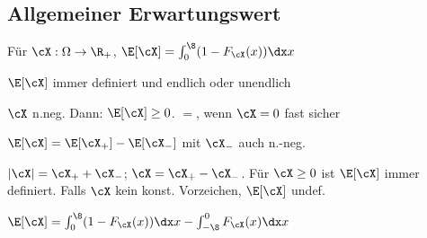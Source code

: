 \subsection{Allgemeiner Erwartungswert}
\shortdefinition Für $\cX : \Omega \rightarrow \R_+$, $\E[\cX] = \int_{0}^{\8} (1 - F_\cX(x)) \dx x$

\shortremark $\E[\cX]$ immer definiert und endlich oder unendlich

\shorttheorem $\cX$ n.neg. Dann: $\E[\cX] \geq 0$. $=$, wenn $\cX = 0$ fast sicher

\shortdefinition $\E[\cX] = \E[\cX_+] - \E[\cX_-]$ mit $\cX_-$ auch n.-neg.

\shortremark $|\cX| = \cX_+ + \cX_-$; $\cX = \cX_+ - \cX_-$. Für $\cX \geq 0$ ist $\E[\cX]$ immer definiert.
Falls $\cX$ kein konst. Vorzeichen, $\E[\cX]$ undef.

\shortremark $\E[\cX] = \int_{0}^{\8} (1 - F_\cX(x)) \dx x - \int_{-\8}^{0} F_\cX(x) \dx x$
